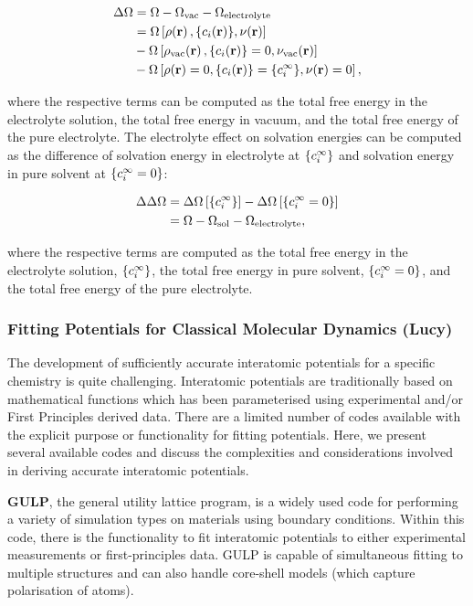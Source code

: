 \documentclass[../main.tex]{subfiles}
\begin{document}
\begin{align}
    \Delta\Omega &=\Omega-\Omega_{\textrm{vac}}-\Omega_{\textrm{electrolyte}} \\
    &=\Omega\left[\rho\ofrvec,\{\ci\ofrvec\},\nu\ofrvec\right] \\
    \nonumber
    &-\Omega\left[\rho_{\textrm{vac}}\ofrvec,\{\ci\ofrvec\}=0,\nu_{\textrm{vac}}\ofrvec\right] \\
    \nonumber
    &-\Omega\left[\rho\ofrvec=0,\{\ci\ofrvec\}=\{\cif\},\nu\ofrvec=0\right]
    \nonumber,
\end{align}

where the respective terms can be computed as the total free energy in the electrolyte solution, the total free energy in vacuum, and the total free energy of the pure electrolyte.\cite{Dziedzic2020} The electrolyte effect on solvation energies can be computed as the difference of solvation energy in electrolyte at $\{c_i^{\infty}\}$ and solvation energy in pure solvent at $\{c_i^{\infty}=0\}$:

\begin{align}
    \Delta\Delta\Omega    &= \Delta\Omega\left[{\{c_i^{\infty}\}}\right]-\Delta\Omega\left[{\{c_i^{\infty}=0\}}\right] \\
    &= \Omega - \Omega_{\textrm{sol}} - \Omega_{\textrm{electrolyte}},
\end{align}

where the respective terms are computed as the total free energy in the electrolyte solution, $\{c_i^{\infty}\}$, the total free energy in pure solvent, $\{c_i^{\infty}=0\}$, and the total free energy of the pure electrolyte. 


\subsubsection{Fitting Potentials for Classical Molecular Dynamics (Lucy)}
\label{sec:potential_fitting}
The development of sufficiently accurate interatomic potentials for a specific chemistry is quite challenging. Interatomic potentials are traditionally based on mathematical functions which has been parameterised using experimental and/or First Principles derived data. \cite{jones_1924, buckingham_classical_1938} There are a limited number of codes available with the explicit purpose or functionality for fitting potentials. Here, we present several available codes and discuss the complexities and considerations involved in deriving accurate interatomic potentials.

\textbf{GULP}, \cite{GULP} the general utility lattice program, is a widely used code for performing a variety of simulation types on materials using boundary conditions. \cite{gale_gulp_1997} Within this code, there is the functionality to fit interatomic potentials to either experimental measurements or first-principles data.\cite{gale_empirical_1996} GULP is capable of simultaneous fitting to multiple structures and can also handle core-shell models (which capture polarisation of atoms).
\end{document}
